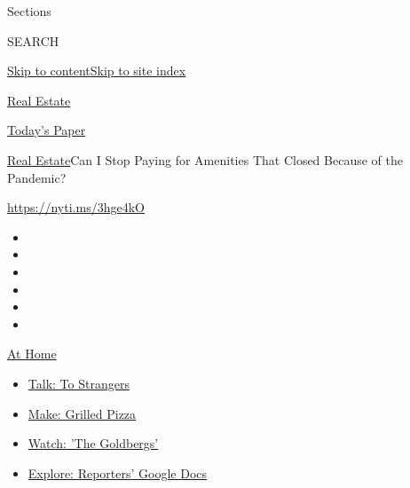 Sections

SEARCH

\protect\hyperlink{site-content}{Skip to
content}\protect\hyperlink{site-index}{Skip to site index}

\href{https://www.nytimes3xbfgragh.onion/section/realestate}{Real
Estate}

\href{https://myaccount.nytimes3xbfgragh.onion/auth/login?response_type=cookie\&client_id=vi}{}

\href{https://www.nytimes3xbfgragh.onion/section/todayspaper}{Today's
Paper}

\href{/section/realestate}{Real Estate}\textbar{}Can I Stop Paying for
Amenities That Closed Because of the Pandemic?

\url{https://nyti.ms/3hge4kO}

\begin{itemize}
\item
\item
\item
\item
\item
\item
\end{itemize}

\href{https://www.nytimes3xbfgragh.onion/spotlight/at-home?action=click\&pgtype=Article\&state=default\&region=TOP_BANNER\&context=at_home_menu}{At
Home}

\begin{itemize}
\tightlist
\item
  \href{https://www.nytimes3xbfgragh.onion/2020/08/03/well/family/the-benefits-of-talking-to-strangers.html?action=click\&pgtype=Article\&state=default\&region=TOP_BANNER\&context=at_home_menu}{Talk:
  To Strangers}
\item
  \href{https://www.nytimes3xbfgragh.onion/2020/08/01/at-home/coronavirus-make-pizza-on-a-grill.html?action=click\&pgtype=Article\&state=default\&region=TOP_BANNER\&context=at_home_menu}{Make:
  Grilled Pizza}
\item
  \href{https://www.nytimes3xbfgragh.onion/2020/07/31/arts/television/goldbergs-abc-stream.html?action=click\&pgtype=Article\&state=default\&region=TOP_BANNER\&context=at_home_menu}{Watch:
  'The Goldbergs'}
\item
  \href{https://www.nytimes3xbfgragh.onion/interactive/2020/at-home/even-more-reporters-editors-diaries-lists-recommendations.html?action=click\&pgtype=Article\&state=default\&region=TOP_BANNER\&context=at_home_menu}{Explore:
  Reporters' Google Docs}
\end{itemize}

